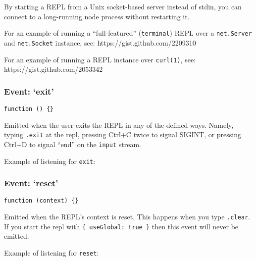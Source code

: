 By starting a REPL from a Unix socket-based server instead of stdin, you
can connect to a long-running node process without restarting it.

For an example of running a ``full-featured'' (\texttt{terminal}) REPL
over a \texttt{net.Server} and \texttt{net.Socket} instance, see:
https://gist.github.com/2209310

For an example of running a REPL instance over \texttt{curl(1)}, see:
https://gist.github.com/2053342

\subsubsection{Event: `exit'}

\texttt{function () \{\}}

Emitted when the user exits the REPL in any of the defined ways. Namely,
typing \texttt{.exit} at the repl, pressing Ctrl+C twice to signal
SIGINT, or pressing Ctrl+D to signal ``end'' on the \texttt{input}
stream.

Example of listening for \texttt{exit}:

\begin{Shaded}
\begin{Highlighting}[]
\NormalTok{(}\NormalTok{, } \NormalTok{() \{}
  \NormalTok{(}\NormalTok{);}
  \NormalTok{();}
\NormalTok{\});}
\end{Highlighting}
\end{Shaded}

\subsubsection{Event: `reset'}

\texttt{function (context) \{\}}

Emitted when the REPL's context is reset. This happens when you type
\texttt{.clear}. If you start the repl with
\texttt{\{ useGlobal: true \}} then this event will never be emitted.

Example of listening for \texttt{reset}:

\begin{Shaded}
\begin{Highlighting}[]
\NormalTok{(}\NormalTok{);}

\NormalTok{(}\NormalTok{, } 
  \NormalTok{(}\NormalTok{);}
\NormalTok{\});}
\end{Highlighting}
\end{Shaded}

